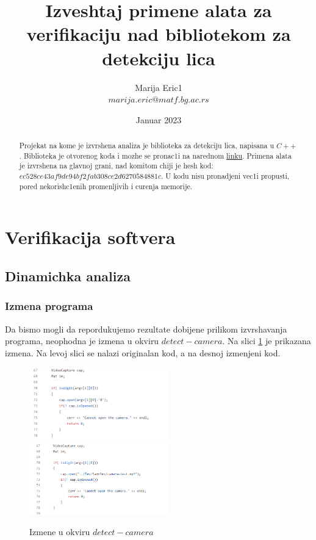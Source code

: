 \documentclass{article}
\title{Izveshtaj primene alata za verifikaciju nad bibliotekom za detekciju lica}
\author{Marija Eric1 \\ 
$marija.eric@matf.bg.ac.rs$}
\date{Januar 2023}
\begin{document}
\maketitle
\renewcommand{\abstractname}{Sazhetak}
\renewcommand*\contentsname{Sadrzhaj}



\begin{abstract}
Projekat na kome je izvrshena analiza je biblioteka za detekciju lica, napisana u $C++$. Biblioteka je otvorenog koda i mozhe se pronac1i na narednom \href{https://github.com/ShiqiYu/libfacedetection}{linku}. 
Primena alata je izvrshena na glavnoj grani, nad komitom chiji je hesh kod: $ec528ce43af9de94bf2fab308ce2d6270584881c$. U kodu nisu pronadjeni vec1i propusti, pored nekorish\-c1enih promenljivih i curenja memorije.
\end{abstract}
\tableofcontents
\newpage

\section{Verifikacija softvera}
\subsection{Dinamichka analiza}
\subsubsection{Izmena programa}
Da bismo mogli da repordukujemo rezultate dobijene prilikom izvrshavanja programa, neophodna je izmena u okviru $detect-camera$.
Na slici \ref{izmene} je prikazana izmena. Na levoj slici se nalazi originalan kod, a na desnoj izmenjeni kod.
\begin{figure}[H]
    \centering
    \includegraphics[width=6cm]{img/dc-original.png}
    \includegraphics[width=6cm]{img/dc-izmena.png}
    
    \caption{Izmene u okviru $detect-camera$}
    \label{izmene}
\end{figure}
\end{document}
